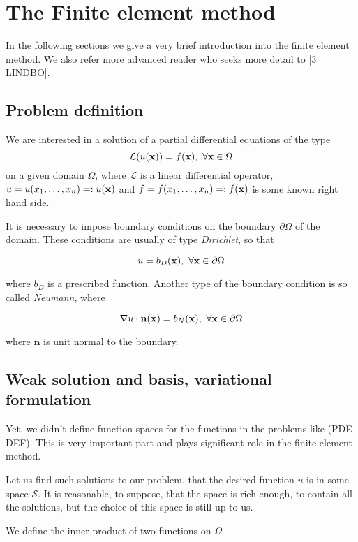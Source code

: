\chapter{The Finite element method}

\par In the following sections we give a very brief introduction into the finite element method. 
We also refer more advanced reader who seeks more detail to [3 LINDBO].

\section{Problem definition}

\par We are interested in a solution of a partial differential equations of the type 
$$\mathcal{L}(u(\mathbf{x})) = f(\mathbf{x}),~\forall \mathbf{x}\in\Omega$$
on a given domain $\Omega$, where $\mathcal{L}$ is a linear differential operator, 
$u = u(x_1,\ldots,x_n)=: u(\mathbf{x})$
and
$f = f(x_1,\ldots,x_n) =: f(\mathbf{x})$
is some known right hand side.

\par It is necessary to impose boundary conditions on the boundary $\partial\Omega$ of the domain. These conditions are usually of type \textit{Dirichlet}, so that

$$ u = b_D(\mathbf{x}),~\forall \mathbf{x} \in \partial\Omega $$

where $b_D$ is a prescribed function. Another type of the boundary condition is so called \textit{Neumann}, where

$$ \nabla u \cdot \mathbf{n}(\mathbf{x}) = b_N(\mathbf{x}),~\forall \mathbf{x}\in\partial\Omega $$

where $\mathbf{n}$ is unit normal to the boundary.

\section{Weak solution and basis, variational formulation}

\par Yet, we didn't define function spaces for the functions in the problems like (PDE DEF). 
This is very important part and plays significant role in the finite element method.
\par Let us find such solutions to our problem, that the desired function $u$ is in some space $\mathcal{S}$.
It is reasonable, to suppose, that the space is rich enough, to contain all the solutions, but the choice of this space is still up to us. 
\par We define the inner product of two functions on $\Omega$ 

